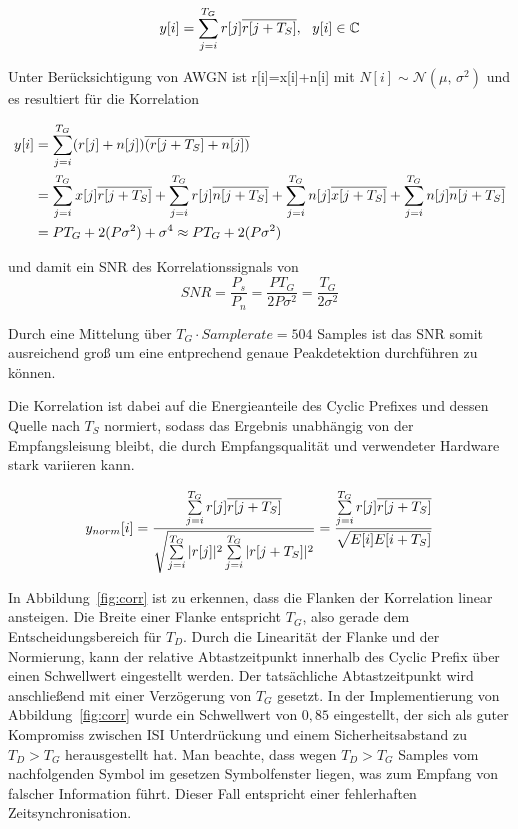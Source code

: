 \begin{equation}
y[i] = \sum \limits_{j=i}^{T_G}r[j] \overline{r[j+T_S]}, \ \ y[i] \in \mathbb{C}
\label{eq:corr_einfach}
\end{equation}

Unter Berücksichtigung von AWGN ist r[i]=x[i]+n[i] mit $N[i] \sim \mathcal{N}(\mu,\,\sigma^{2})$ und es resultiert für die Korrelation

\begin{equation}
    \begin{aligned}
y[i] &= \sum \limits_{j=i}^{T_G}(r[j]+n[j]) \overline{(r[j+T_S]+n[j])} \\
&= \sum \limits_{j=i}^{T_G}x[j] \overline{r[j+T_S]} + \sum \limits_{j=i}^{T_G}r[j] \overline{n[j+T_S]} + \sum \limits_{j=i}^{T_G}n[j] \overline{x[j+T_S]} + \sum \limits_{j=i}^{T_G}n[j] \overline{n[j+T_S]} \\
&= P T_G + 2(P \sigma^2) + \sigma^4 \approx P T_G + 2(P \sigma^2)
    \end{aligned}
\end{equation}

und damit ein SNR des Korrelationssignals von
\begin{equation}
SNR = \frac{P_s}{P_n} = \frac{P T_G}{2 P \sigma^2} = \frac{T_G}{2 \sigma^2}
\end{equation}

Durch eine Mittelung über $T_G \cdot Samplerate = 504$ Samples ist das SNR somit ausreichend groß um eine entprechend genaue Peakdetektion durchführen zu können.

Die Korrelation ist dabei auf die Energieanteile des Cyclic Prefixes und dessen Quelle nach $T_S$ normiert, sodass das Ergebnis unabhängig von der Empfangsleisung bleibt, die durch Empfangsqualität und verwendeter Hardware stark variieren kann.

\begin{equation}
    y_{norm}[i] = \frac{\sum \limits_{j=i}^{T_G}r[j] \overline{r[j+T_S]}}{\sqrt{\sum \limits_{j=i}^{T_G}|r[j]|^2 \sum \limits_{j=i}^{T_G}|r[j+T_S]|^2}} = \frac{\sum \limits_{j=i}^{T_G}r[j]     \overline{r[j+T_S]}}{\sqrt{E[i]E[i+T_S]}}
    \label{eq:norm_corr}
\end{equation}

In Abbildung~\ref{fig:corr} ist zu erkennen, dass die Flanken der Korrelation linear ansteigen. Die Breite einer Flanke entspricht $T_G$, also gerade dem Entscheidungsbereich für $T_D$. Durch die Linearität der Flanke und der Normierung, kann der relative Abtastzeitpunkt innerhalb des Cyclic Prefix über einen Schwellwert eingestellt werden. Der tatsächliche Abtastzeitpunkt wird anschließend mit einer Verzögerung von $T_G$ gesetzt. In der Implementierung von Abbildung~\ref{fig:corr} wurde ein Schwellwert von $0,85$ eingestellt, der sich als guter Kompromiss zwischen \ac{ISI} Unterdrückung und einem Sicherheitsabstand zu $T_D > T_G$ herausgestellt hat. Man beachte, dass wegen $T_D > T_G$ Samples vom nachfolgenden Symbol im gesetzen Symbolfenster liegen, was zum Empfang von falscher Information führt. Dieser Fall entspricht einer fehlerhaften Zeitsynchronisation.

